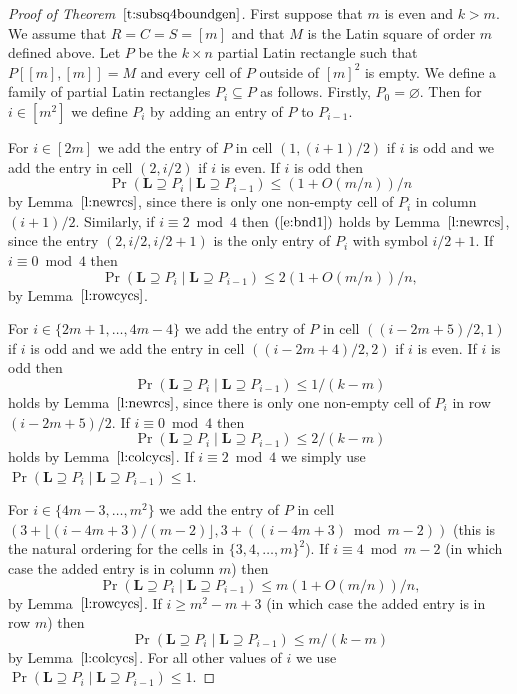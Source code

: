 \documentclass[12pt]{article}
\theoremstyle{definition}
\numberwithin{equation}{section}
\def\eref#1{$(\ref{#1})$}
\def\lref#1{Lemma~$\ref{#1}$}
\def\tref#1{Theorem~$\ref{#1}$}
\renewcommand{\geq}{\geqslant}
\renewcommand{\leq}{\leqslant}
\renewcommand{\le}{\leqslant}
\renewcommand{\emptyset}{\varnothing}
\renewcommand{\L}{\mathbf{L}}
\begin{document}
	\begin{proof}[Proof of \tref{t:subsq4boundgen}]
		First suppose that $m$ is even and $k>m$. We assume that $R=C=S=[m]$ and that $M$ is the Latin square of order $m$ defined above. Let $P$ be the $k \times n$ partial Latin rectangle such that $P[[m], [m]] = M$ and every cell of $P$ outside of $[m]^2$ is empty. We define a family of partial Latin rectangles $P_i \subseteq P$ as follows. Firstly, $P_0 = \emptyset$. Then for $i \in [m^2]$ we define $P_i$ by adding an entry of $P$ to $P_{i-1}$. 
		
		For $i \in [2m]$ we add the entry of $P$ in cell $(1, (i+1)/2)$ if $i$ is odd and we add the entry in cell $(2, i/2)$ if $i$ is even. If $i$ is odd then
		\begin{equation}\label{e:bnd1}
			\Pr(\L \supseteq P_i \mid  \L \supseteq P_{i-1}) \leq (1+O(m/n))/n
		\end{equation}
		by \lref{l:newrcs}, since there is only one non-empty cell of $P_i$ in column $(i+1)/2$. Similarly, if $i \equiv 2 \bmod 4$ then
		\eref{e:bnd1} holds
		by \lref{l:newrcs}, since the entry $(2, i/2, i/2+1)$ is the only entry of $P_i$ with symbol $i/2+1$. If $i \equiv 0 \bmod 4$ then
		\begin{equation}\label{e:bnd2}
			\Pr(\L \supseteq P_i \mid  \L \supseteq P_{i-1}) \leq 2(1+O(m/n))/n,
		\end{equation}
		by \lref{l:rowcycs}. 
		
		For $i \in \{2m+1, \ldots, 4m-4\}$ we add the entry of $P$ in cell
		$((i-2m+5)/2, 1)$ if $i$ is odd and we add the entry in cell
		$((i-2m+4)/2, 2)$ if $i$ is even. If $i$ is odd then 
		\begin{equation}\label{e:bndk1}
			\Pr(\L \supseteq P_i \mid  \L \supseteq P_{i-1}) \leq 1/(k-m)
		\end{equation}
		holds by \lref{l:newrcs}, since there is only one
		non-empty cell of $P_i$ in row $(i-2m+5)/2$. If
		$i \equiv 0 \bmod 4$ then 
		\begin{equation}\label{e:bndk2}
			\Pr(\L \supseteq P_i \mid  \L \supseteq P_{i-1}) \leq 2/(k-m)
		\end{equation}
		holds by \lref{l:colcycs}. If $i \equiv 2 \bmod 4$
		we simply use $\Pr(\L \supseteq P_i \mid \L \supseteq P_{i-1})\le1$.
		
		For $i \in \{4m-3, \ldots, m^2\}$ we add the entry of $P$ in cell $(3+\lfloor (i-4m+3)/(m-2) \rfloor, 3+((i-4m+3) \bmod m-2))$ (this is the natural ordering for the cells in $\{3, 4, \ldots, m\}^2$). If $i \equiv 4 \bmod m-2$ (in which case the added entry is in column $m$) then
		\begin{equation}\label{e:bnd3}
			\Pr(\L \supseteq P_i \mid  \L \supseteq P_{i-1}) \leq m(1+O(m/n))/n,
		\end{equation}
		by \lref{l:rowcycs}. If $i \geq m^2-m+3$ (in which case the added entry is in
		row $m$) then
		\begin{equation}\label{e:bndk3}
			\Pr(\L \supseteq P_i \mid  \L \supseteq P_{i-1}) \leq m/(k-m)
		\end{equation}
		by \lref{l:colcycs}.  For all other values of $i$ we
		use $\Pr(\L \supseteq P_i \mid \L \supseteq P_{i-1})\le1$.
		

\end{proof}
\end{document}
